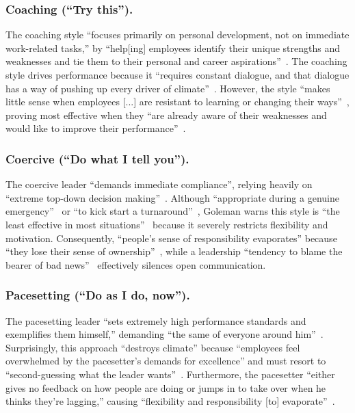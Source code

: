 \subsubsection{Coaching (``Try this'').}
The coaching style ``focuses primarily on personal development, not on immediate work-related tasks,'' by ``help[ing] employees identify their unique strengths and weaknesses and tie them to their personal and career aspirations''~\cite[p.~87]{goleman2000leadership}. 
The coaching style drives performance because it ``requires constant dialogue, and that dialogue has a way of pushing up every driver of climate''~\cite[p.~87]{goleman2000leadership}.
However, the style ``makes little sense when employees [...] are resistant to learning or changing their ways''~\cite[p.~87]{goleman2000leadership}, proving most effective when they ``are already aware of their weaknesses and would like to improve their performance''~\cite[p.~87]{goleman2000leadership}.

\subsubsection{Coercive (``Do what I tell you'').}
The coercive leader ``demands immediate compliance'', relying heavily on ``extreme top-down decision making''~\cite[p.~82]{goleman2000leadership}. 
Although ``appropriate during a genuine emergency''~\cite[p.~83]{goleman2000leadership} or ``to kick start a turnaround''~\cite[p.~82]{goleman2000leadership}, Goleman warns this style is ``the least effective in most situations''~\cite[p.~82]{goleman2000leadership} because it severely restricts flexibility and motivation. 
Consequently, ``people's sense of responsibility evaporates'' because ``they lose their sense of ownership''~\cite[p.~82]{goleman2000leadership}, while a leadership ``tendency to blame the bearer of bad news''~\cite[p.~82]{goleman2000leadership} effectively silences open communication.

\subsubsection{Pacesetting (``Do as I do, now'').}
The pacesetting leader ``sets extremely high performance standards and exemplifies them himself,'' demanding ``the same of everyone around him''~\cite[p.~86]{goleman2000leadership}. 
Surprisingly, this approach ``destroys climate'' because ``employees feel overwhelmed by the pacesetter's demands for excellence'' and must resort to ``second-guessing what the leader wants''~\cite[p.~86]{goleman2000leadership}. 
Furthermore, the pacesetter ``either gives no feedback on how people are doing or jumps in to take over when he thinks they're lagging,'' causing ``flexibility and responsibility [to] evaporate''~\cite[p.~86]{goleman2000leadership}. 

